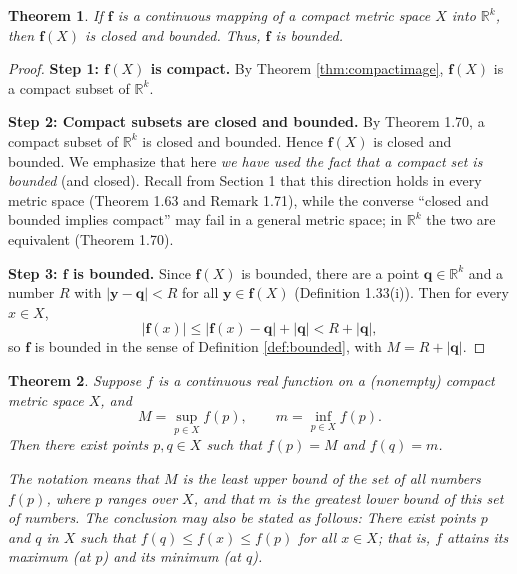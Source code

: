 \documentclass{article}
\theoremstyle{mythm}
\newtheorem{theorem}{Theorem}[section]
\begin{document}
\begin{theorem}\label{thm:closedbounded}
If $\mathbf{f}$ is a continuous mapping of a compact metric space $X$ into $\mathbb{R}^k$, then $\mathbf{f}(X)$ is closed and bounded. Thus, $\mathbf{f}$ is bounded.
\end{theorem}

\begin{proof}
\textbf{Step 1: $\mathbf{f}(X)$ is compact.} By Theorem \ref{thm:compactimage}, $\mathbf{f}(X)$ is a compact subset of $\mathbb{R}^k$.

\textbf{Step 2: Compact subsets are closed and bounded.} By Theorem 1.70, a compact subset of $\mathbb{R}^k$ is closed and bounded. Hence $\mathbf{f}(X)$ is closed and bounded. We emphasize that here \textit{we have used the fact that a compact set is bounded} (and closed). Recall from Section 1 that this direction holds in every metric space (Theorem 1.63 and Remark 1.71), while the converse ``closed and bounded implies compact'' may fail in a general metric space; in $\mathbb{R}^k$ the two are equivalent (Theorem 1.70).

\textbf{Step 3: $\mathbf{f}$ is bounded.} Since $\mathbf{f}(X)$ is bounded, there are a point $\mathbf{q} \in \mathbb{R}^k$ and a number $R$ with $|\mathbf{y} - \mathbf{q}| < R$ for all $\mathbf{y} \in \mathbf{f}(X)$ (Definition 1.33(i)). Then for every $x \in X$,
\[
|\mathbf{f}(x)| \leq |\mathbf{f}(x) - \mathbf{q}| + |\mathbf{q}| < R + |\mathbf{q}|,
\]
so $\mathbf{f}$ is bounded in the sense of Definition \ref{def:bounded}, with $M = R + |\mathbf{q}|$.
\end{proof}

\begin{theorem}\label{thm:maxmin}
Suppose $f$ is a continuous real function on a (nonempty) compact metric space $X$, and
\[
M = \sup_{p \in X} f(p), \qquad m = \inf_{p \in X} f(p).
\]
Then there exist points $p, q \in X$ such that $f(p) = M$ and $f(q) = m$.

The notation means that $M$ is the least upper bound of the set of all numbers $f(p)$, where $p$ ranges over $X$, and that $m$ is the greatest lower bound of this set of numbers. The conclusion may also be stated as follows: There exist points $p$ and $q$ in $X$ such that $f(q) \leq f(x) \leq f(p)$ for all $x \in X$; that is, $f$ attains its maximum (at $p$) and its minimum (at $q$).
\end{theorem}
\end{document}
